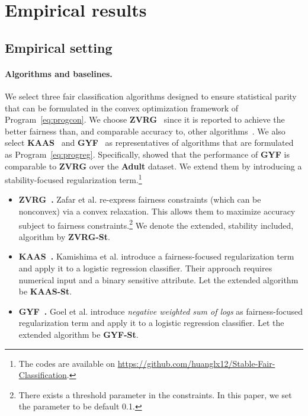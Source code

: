 \documentclass[11pt]{article}
\begin{document}
\section{Empirical results}
\label{sec:experiment}

\subsection{Empirical setting}

\paragraph{Algorithms and baselines.} 
We select three fair classification algorithms designed to ensure statistical parity that can be  formulated in the  convex optimization framework of Program~\eqref{eq:progcon}.
%
We choose \textbf{ZVRG}~\cite{zafar2017fair} since it is reported to achieve the better fairness than, and comparable accuracy to, other algorithms~\cite{friedler2018comparative}.
%
We also select
\textbf{KAAS}~\cite{kamishima2012fairness} and \textbf{GYF}~\cite{goel2018non} as representatives of algorithms that are formulated as Program~\eqref{eq:progreg}.
% 
Specifically, \cite{goel2018non} showed that the performance of \textbf{GYF} is comparable to \textbf{ZVRG} over the \textbf{Adult} dataset. 
%
We extend them by introducing a stability-focused regularization term.\footnote{The codes are available on \url{https://github.com/huanglx12/Stable-Fair-Classification}.}
%
%
\vspace{-3mm}
\begin{itemize}
	\item \textbf{ZVRG~\cite{zafar2017fairness}.} Zafar et al. re-express fairness constraints (which can be nonconvex) via a convex relaxation. 
	This allows them to maximize accuracy subject to fairness constraints.\footnote{There exists a threshold parameter in the constraints. In this paper, we set the parameter to be default 0.1.}
	We denote  the extended, stability included, algorithm by \textbf{ZVRG-St}.
	\vspace{-3mm}
	
	\item \textbf{KAAS~\cite{kamishima2012fairness}.} Kamishima et al. introduce a fairness-focused regularization term and apply it to a logistic regression classifier. 
	Their approach requires numerical input and a binary sensitive attribute.
	Let the extended algorithm be \textbf{KAAS-St}.
	\vspace{-3mm}
	
	\item \textbf{GYF~\cite{goel2018non}.} Goel et al. introduce \emph{negative weighted sum of logs} as fairness-focused regularization term and apply it to a logistic regression classifier. 
	Let the extended algorithm be \textbf{GYF-St}.
\end{itemize}
\end{document}
